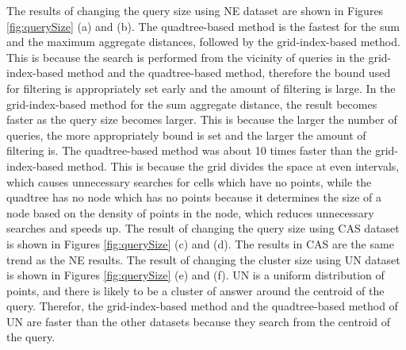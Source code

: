 \documentclass[a4paper,11pt]{report}
\theoremstyle{mytheoremstyle}
\begin{document}
The results of changing the query size using NE dataset are shown in Figures \ref{fig:querySize} (a) and (b). The quadtree-based method is the fastest for the sum and the maximum aggregate distances, followed by the grid-index-based method. This is because the search is performed from the vicinity of queries in the grid-index-based method and the quadtree-based method, therefore the bound used for filtering is appropriately set early and the amount of filtering is large. In the grid-index-based method for the sum aggregate distance, the result becomes faster as the query size becomes larger. This is because the larger the number of queries, the more appropriately bound is set and the larger the amount of filtering is.
The quadtree-based method was about 10 times faster than the grid-index-based method. This is because the grid divides the space at even intervals, which causes unnecessary searches for cells which have no points, while the quadtree has no node which has no points because it determines the size of a node based on the density of points in the node, which reduces unnecessary searches and speeds up.
The result of changing the query size using CAS dataset is shown in Figures \ref{fig:querySize} (c) and (d). The results in CAS are the same trend as the NE results.
The result of changing the cluster size using UN dataset is shown in Figures \ref{fig:querySize} (e) and (f). UN is a uniform distribution of points, and there is likely to be a cluster of answer around the centroid of the query. Therefor, the grid-index-based method and the quadtree-based method of UN are faster than the other datasets because they search from the centroid of the query.
\end{document}
